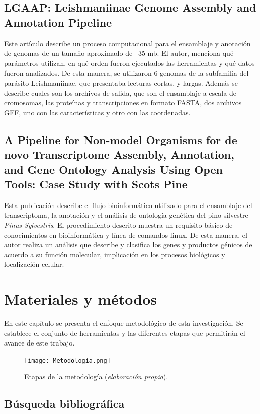 \documentclass[12pt]{article}
\begin{document}
\subsection*{LGAAP: Leishmaniinae Genome Assembly and Annotation Pipeline}
Este artículo describe un proceso computacional para el ensamblaje y anotación de 
genomas de un tamaño aproximado de ~35 mb. El autor, menciona qué parámetros utilizan, 
en qué orden fueron ejecutados las herramientas y qué datos fueron analizados.  
De esta manera, se utilizaron 6 genomas de la subfamilia del parásito Leishmaniinae, 
que presentaba lecturas cortas, y largas. Además se describe cuales son los archivos
de salida, que son el ensamblaje a escala de cromosomas, las proteínas y transcripciones 
en formato FASTA, dos archivos GFF, uno con las características y otro con las coordenadas.

\subsection*{A Pipeline for Non-model Organisms for de novo Transcriptome Assembly, Annotation, and Gene Ontology Analysis Using Open Tools: Case Study with Scots Pine }
Esta publicación describe el flujo bioinformático utilizado para el ensamblaje del 
transcriptoma, la anotación y el análisis de ontología genética del pino silvestre 
\emph{Pinus Sylvestris}. El procedimiento descrito muestra un requisito básico de 
conocimientos en bioinformática  y línea de comandos linux. De esta manera, el autor 
realiza un análisis que describe y clasifica los genes y productos génicos de acuerdo a 
su función molecular, implicación en los procesos biológicos y localización celular.

\newpage
\section{Materiales y métodos}

En este capítulo se presenta  el enfoque metodológico de esta 
investigación. Se establece el conjunto de herramientas y 
las diferentes etapas que permitirán el avance de este trabajo.

\begin{figure}[ht!]
    \centering
    \small
    \texttt{[image: Metodología.png]}
    \caption{Etapas de la metodología (\emph{elaboración propia}).}
    \label{fig:distribucion}
\end{figure}

\subsection*{Búsqueda bibliográfica}
\end{document}
